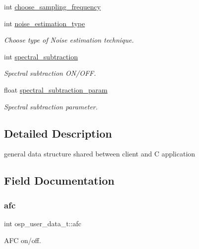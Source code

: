 \begin{DoxyCompactItemize}
int \mbox{\hyperlink{structosp__user__data__t_a7aac3aa1476589a9014fef82cbcc4c4c}{choose\+\_\+sampling\+\_\+frequency}}
\item 
int \mbox{\hyperlink{structosp__user__data__t_ab6c6864ef4a835caedfac8f7757d3646}{noise\+\_\+estimation\+\_\+type}}
\begin{DoxyCompactList}\small\item\em Choose type of Noise estimation technique. \end{DoxyCompactList}\item 
int \mbox{\hyperlink{structosp__user__data__t_a4d4b5738a5abe27d67dbbc278959defa}{spectral\+\_\+subtraction}}
\begin{DoxyCompactList}\small\item\em Spectral subtraction O\+N/\+O\+FF. \end{DoxyCompactList}\item 
float \mbox{\hyperlink{structosp__user__data__t_a21ab3e8e57f137d0308868f84d09631f}{spectral\+\_\+subtraction\+\_\+param}}
\begin{DoxyCompactList}\small\item\em Spectral subtraction parameter. \end{DoxyCompactList}\end{DoxyCompactItemize}


\subsection{Detailed Description}
general data structure shared between client and C application 

\subsection{Field Documentation}
\mbox{\label{structosp__user__data__t_a5eca0400f27a8aaf1b9ce3e961720af8}} 
\subsubsection{\texorpdfstring{afc}{afc}}
{\footnotesize\ttfamily int osp\+\_\+user\+\_\+data\+\_\+t\+::afc}



A\+FC on/off. 

\mbox{\label{structosp__user__data__t_abb30fbb6fa960d660b72e18ecd82ee88}} 
